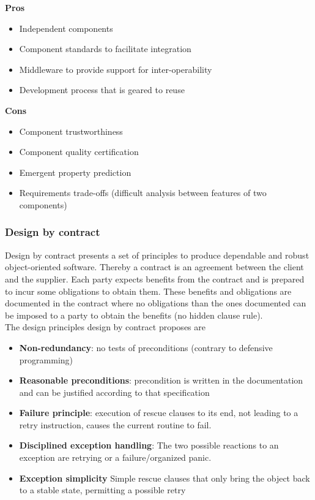 \begin{minipage}[t]{0.49\textwidth}
    \textbf{Pros}
    \begin{itemize}[topsep=0pt, itemsep=0pt]
        \item Independent components
        \item Component standards to facilitate integration
        \item Middleware to provide support for inter-operability
        \item Development process that is geared to reuse
    \end{itemize}
\end{minipage}
\begin{minipage}[t]{0.49\textwidth}
    \textbf{Cons}
    \begin{itemize}[topsep=0pt, itemsep=0pt]
        \item Component trustworthiness
        \item Component quality certification
        \item Emergent property prediction
        \item Requirements trade-offs (difficult analysis between features of two components)
    \end{itemize}
\end{minipage}

\subsubsection{Design by contract}
Design by contract presents a set of principles to produce dependable and robust object-oriented software.
Thereby a contract is an agreement between the client and the supplier.
Each party expects benefits from the contract and is prepared to incur some obligations to obtain them.
These benefits and obligations are documented in the contract where no obligations than the ones documented can be imposed to a party to obtain the benefits (no hidden clause rule).\\
The design principles design by contract proposes are
\begin{itemize}
  \item \textbf{Non-redundancy}: no tests of preconditions (contrary to defensive programming)
  \item \textbf{Reasonable preconditions}: precondition is written in the documentation and can be justified according to that specification
  \item \textbf{Failure principle}: execution of rescue clauses to its end, not leading to a retry instruction, causes the current routine to fail.
  \item \textbf{Disciplined exception handling}: The two possible reactions to an exception are retrying or a failure/organized panic.
  \item \textbf{Exception simplicity} Simple rescue clauses that only bring the object back to a stable state, permitting a possible retry
\end{itemize}

